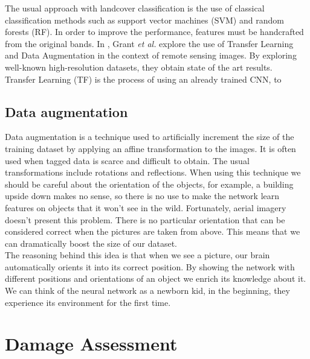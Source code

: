 The usual approach with landcover classification is the use of classical classification methods such as support vector machines (SVM) and random forests (RF). In order to improve the performance, features must be handcrafted from the original bands. In \cite{7858676}, Grant \textit{et al.} explore the use of Transfer Learning and Data Augmentation in the context of remote sensing images. By exploring well-known high-resolution datasets, they obtain state of the art results.\\

Transfer Learning (TF) is the process of using an already trained CNN, to 

\subsection{Data augmentation}

Data augmentation is a technique used to artificially increment the size of the training dataset by applying an affine transformation to the images. It is often used when tagged data is scarce and difficult to obtain. The usual transformations include rotations and reflections. When using this technique we should be careful about the orientation of the objects, for example, a building upside down makes no sense, so there is no use to make the network learn features on objects that it won't see in the wild. Fortunately, aerial imagery doesn't present this problem. There is no particular orientation that can be considered correct when the pictures are taken from above. This means that we can dramatically boost the size of our dataset.\\

The reasoning behind this idea is that when we see a picture, our brain automatically orients it into its correct position. By showing the network with different positions and orientations of an object we enrich its knowledge about it.\\

We can think of the neural network as a newborn kid, in the beginning, they experience its environment for the first time.\\



\section{Damage Assessment}


